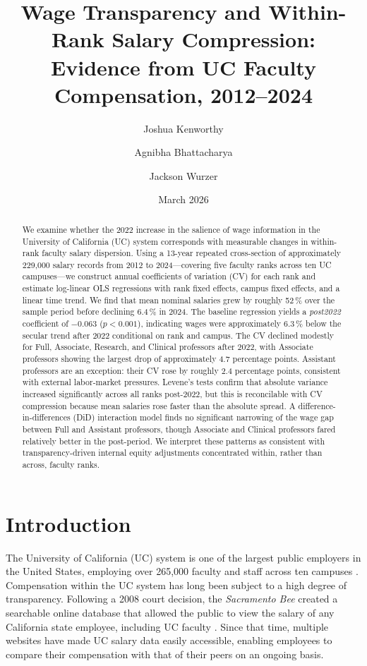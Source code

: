 \documentclass[12pt]{article}
\title{\textbf{Wage Transparency and Within-Rank Salary Compression:\\
Evidence from UC Faculty Compensation, 2012--2024}}
\author{
  Joshua Kenworthy \and
  Agnibha Bhattacharya \and
  Jackson Wurzer
}
\date{March 2026}
\begin{document}
\maketitle
\thispagestyle{empty}

\begin{abstract}
\noindent
We examine whether the 2022 increase in the salience of wage information
in the University of California (UC) system corresponds with measurable
changes in within-rank faculty salary dispersion. Using a 13-year
repeated cross-section of approximately 229,000 salary records from
2012 to 2024---covering five faculty ranks across ten UC campuses---we
construct annual coefficients of variation (CV) for each rank and
estimate log-linear OLS regressions with rank fixed effects, campus
fixed effects, and a linear time trend. We find that mean nominal
salaries grew by roughly 52\,\% over the sample period before declining
6.4\,\% in 2024. The baseline regression yields a \textit{post2022}
coefficient of $-0.063$ ($p < 0.001$), indicating wages were
approximately 6.3\,\% below the secular trend after 2022 conditional on
rank and campus. The CV declined modestly for Full, Associate, Research,
and Clinical professors after 2022, with Associate professors showing
the largest drop of approximately 4.7 percentage points. Assistant
professors are an exception: their CV rose by roughly 2.4 percentage
points, consistent with external labor-market pressures. Levene's tests
confirm that absolute variance increased significantly across all ranks
post-2022, but this is reconcilable with CV compression because mean
salaries rose faster than the absolute spread. A
difference-in-differences (DiD) interaction model finds no significant
narrowing of the wage gap between Full and Assistant professors, though
Associate and Clinical professors fared relatively better in the
post-period. We interpret these patterns as consistent with
transparency-driven internal equity adjustments concentrated within,
rather than across, faculty ranks.
\end{abstract}

\newpage
\tableofcontents
\newpage

\section{Introduction}
\label{sec:intro}

The University of California (UC) system is one of the largest public
employers in the United States, employing over 265,000 faculty and staff
across ten campuses \citep{UC2025}. Compensation within the UC system has
long been subject to a high degree of transparency. Following a 2008
court decision, the \textit{Sacramento Bee} created a searchable online
database that allowed the public to view the salary of any California
state employee, including UC faculty \citep[p.~2982]{card2012}. Since
that time, multiple websites have made UC salary data easily accessible,
enabling employees to compare their compensation with that of their peers
on an ongoing basis.
\end{document}
